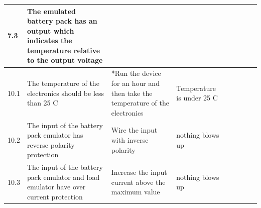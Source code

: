 \begin{table}[!ht]
\begin{tabular}{|l|l|l|l|l|l|l|}
        7.3 & The emulated battery pack has an output which indicates the temperature relative to the output voltage & ~ & ~ & ~ & ~ & ~ \\ \hline
        10.1 & The temperature of the electronics should be less than 25 C & *Run the device for an hour and then take the temperature of the electronics & Temperature is under 25 C & ~ & ~ & ~ \\ \hline
        10.2 & The input of the battery pack emulator has reverse polarity protection & Wire the input with inverse polarity  & nothing blows up & ~ & ~ & ~ \\ \hline
        10.3 & The input of the battery pack emulator and load emulator have over current protection & Increase the input current above the maximum value  & nothing blows up  & ~ & ~ & ~ \\ \hline
    \end{tabular}
\end{table}